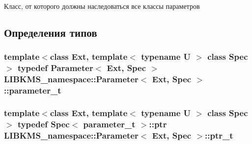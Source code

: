Класс, от которого должны наследоваться все классы параметров 

\subsection{Определения типов}
\hypertarget{classLIBKMS__namespace_1_1Parameter_af353e23edea754f9a2d1c936cd5c8eab}{
\subsubsection[{parameter\-\_\-t}]{\setlength{\rightskip}{0pt plus 5cm}template$<$class Ext, template$<$ typename U $>$ class Spec$>$ typedef {\bf Parameter}$<$ Ext, Spec $>$ {\bf L\-I\-B\-K\-M\-S\-\_\-namespace\-::\-Parameter}$<$ Ext, Spec $>$\-::{\bf parameter\-\_\-t}}}\label{classLIBKMS__namespace_1_1Parameter_af353e23edea754f9a2d1c936cd5c8eab}
\hypertarget{classLIBKMS__namespace_1_1Parameter_a28516bcd5bad5857b2d1c676e4176f51}{
\subsubsection[{ptr\-\_\-t}]{\setlength{\rightskip}{0pt plus 5cm}template$<$class Ext, template$<$ typename U $>$ class Spec$>$ typedef Spec$<$ {\bf parameter\-\_\-t} $>$\-::ptr {\bf L\-I\-B\-K\-M\-S\-\_\-namespace\-::\-Parameter}$<$ Ext, Spec $>$\-::{\bf ptr\-\_\-t}}}\label{classLIBKMS__namespace_1_1Parameter_a28516bcd5bad5857b2d1c676e4176f51}


